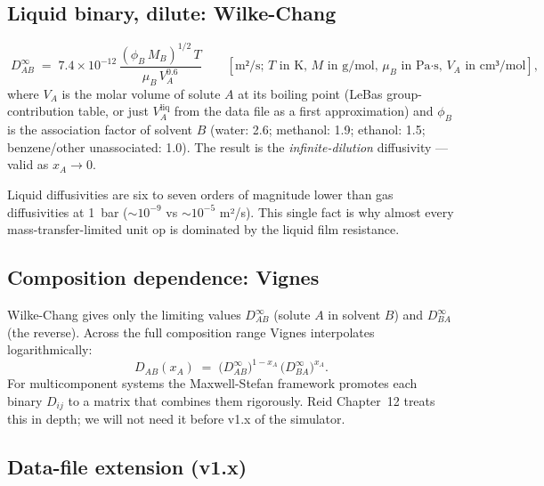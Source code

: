 \documentclass[11pt,a4paper]{article}
\begin{document}
\subsection{Liquid binary, dilute: Wilke-Chang}

\begin{equation}
   \boxed{\;
   D_{AB}^{\infty} \;=\;
     7.4 \times 10^{-12}\,
     \frac{(\phi_B\,M_B)^{1/2}\,T}{\mu_B\,V_A^{0.6}}
     \qquad [\text{m²/s; $T$ in K, $M$ in g/mol, $\mu_B$ in Pa·s, $V_A$ in cm³/mol}],
   \;}
   \label{eq:wilke-chang}
\end{equation}
where $V_A$ is the molar volume of solute $A$ at its boiling point
(LeBas group-contribution table, or just $V^{\mathrm{liq}}_A$ from
the data file as a first approximation) and $\phi_B$ is the
association factor of solvent $B$ (water: 2.6; methanol: 1.9;
ethanol: 1.5; benzene/other unassociated: 1.0).  The result is the
\emph{infinite-dilution} diffusivity --- valid as $x_A \to 0$.

\begin{intuition}
Liquid diffusivities are six to seven orders of magnitude lower
than gas diffusivities at 1~bar ($\sim 10^{-9}$ vs $\sim 10^{-5}$
m²/s).  This single fact is why almost every mass-transfer-limited
unit op is dominated by the liquid film resistance.
\end{intuition}

\subsection{Composition dependence: Vignes}

Wilke-Chang gives only the limiting values $D_{AB}^{\infty}$ (solute
$A$ in solvent $B$) and $D_{BA}^{\infty}$ (the reverse).  Across the
full composition range Vignes interpolates logarithmically:
\begin{equation}
   D_{AB}(x_A) \;=\; \bigl(D_{AB}^{\infty}\bigr)^{1 - x_A}\,
                     \bigl(D_{BA}^{\infty}\bigr)^{x_A}.
   \label{eq:vignes}
\end{equation}
For multicomponent systems the Maxwell-Stefan framework promotes
each binary $D_{ij}$ to a matrix that combines them rigorously.
Reid Chapter~12 treats this in depth; we will not need it before
v1.x of the simulator.

\subsection{Data-file extension (v1.x)}
\end{document}
